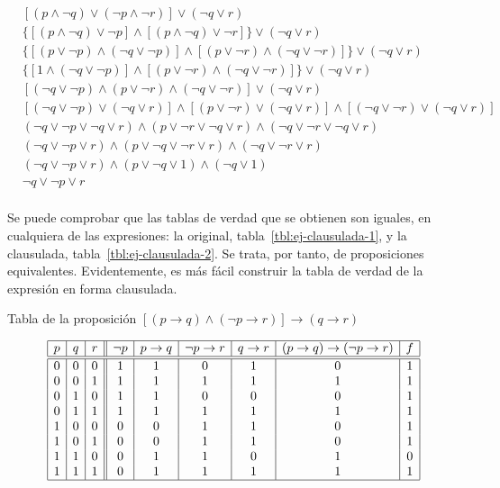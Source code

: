 \begin{align*}
  & [(p \land \neg q) \lor (\neg p \land \neg r)] \lor (\neg q \lor r) \\
  & \{[(p \land \neg q) \lor \neg p] \land [(p \land \neg q) \lor \neg r]\}
    \lor (\neg q \lor r) \\
  & \{[(p \lor \neg p) \land (\neg q \lor \neg p)] \land [(p \lor \neg r)
    \land (\neg q \lor \neg r)]\} \lor (\neg q \lor r) \\
  & \{[1 \land (\neg q \lor \neg p)] \land [(p \lor \neg r) \land (\neg q
    \lor \neg r)]\} \lor (\neg q \lor r) \\
  & [(\neg q \lor \neg p) \land (p \lor \neg r) \land (\neg q \lor \neg r)]
    \lor (\neg q \lor r) \\
  & [(\neg q \lor \neg p) \lor (\neg q \lor r)] \land [(p \lor \neg r) \lor
    (\neg q \lor r)] \land [(\neg q \lor \neg r) \lor (\neg q \lor r)] \\
  & (\neg q \lor \neg p \lor \neg q \lor r) \land (p \lor \neg r \lor \neg q
    \lor r) \land (\neg q \lor \neg r \lor \neg q \lor r) \\
  & (\neg q \lor \neg p \lor r) \land (p \lor \neg q \lor \neg r \lor r)
    \land (\neg q \lor \neg r \lor r) \\
  & (\neg q \lor \neg p \lor r) \land (p \lor \neg q \lor 1) \land (\neg q
    \lor 1) \\
  & \neg q \lor \neg p \lor r \\
\end{align*}

Se puede comprobar que las tablas de verdad que se obtienen son iguales, en
cualquiera de las expresiones: la original, tabla~\ref{tbl:ej-clausulada-1},
y la clausulada, tabla~\ref{tbl:ej-clausulada-2}. Se trata, por tanto, de
proposiciones equivalentes. Evidentemente, es más fácil construir la tabla
de verdad de la expresión en forma clausulada.

\begin{table}%
  \caption{Tabla de la proposición $[(p \to q) \land (\neg p \to r)] \to (q
    \to r)$}
  \label{tbl:ej-clausulada-1}
  \centering
  $$
    \begin{array}{|c|c|c||c|c|c|c|c|c|}
      \hline
      p & q & r & \neg p & p \to q & \neg p \to r & q \to r
        & (p \to q) \to (\neg p \to r) & f \\
      \hline
      \hline
      0 & 0 & 0   & 1 & 1 & 0 & 1 & 0 & 1 \\
      0 & 0 & 1   & 1 & 1 & 1 & 1 & 1 & 1 \\
      0 & 1 & 0   & 1 & 1 & 0 & 0 & 0 & 1 \\
      0 & 1 & 1   & 1 & 1 & 1 & 1 & 1 & 1 \\
      1 & 0 & 0   & 0 & 0 & 1 & 1 & 0 & 1 \\
      1 & 0 & 1   & 0 & 0 & 1 & 1 & 0 & 1 \\
      1 & 1 & 0   & 0 & 1 & 1 & 0 & 1 & 0 \\
      1 & 1 & 1   & 0 & 1 & 1 & 1 & 1 & 1 \\
      \hline
    \end{array}
  $$
\end{table}

